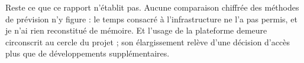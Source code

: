 Reste ce que ce rapport n'établit pas. Aucune comparaison chiffrée des méthodes de prévision n'y
figure : le temps consacré à l'infrastructure ne l'a pas permis, et je n'ai rien reconstitué de
mémoire. Et l'usage de la plateforme demeure circonscrit au cercle du projet ; son élargissement
relève d'une décision d'accès plus que de développements supplémentaires.
